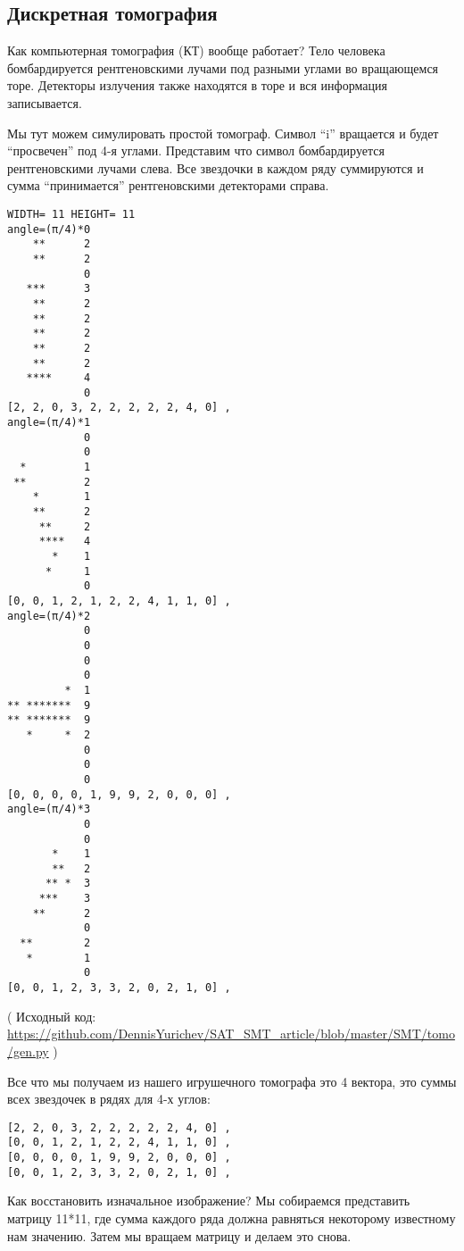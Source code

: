 \subsection{Дискретная томография}

Как компьютерная томография (КТ) вообще работает?
Тело человека бомбардируется рентгеновскими лучами под разными углами во вращающемся торе.
Детекторы излучения также находятся в торе и вся информация записывается.

Мы тут можем симулировать простой томограф.
Символ ``i'' вращается и будет ``просвечен'' под 4-я углами.
Представим что символ бомбардируется рентгеновскими лучами слева.
Все звездочки в каждом ряду суммируются и сумма ``принимается'' рентгеновскими детекторами справа.

\begin{lstlisting}
WIDTH= 11 HEIGHT= 11
angle=(π/4)*0
    **      2
    **      2
            0
   ***      3
    **      2
    **      2
    **      2
    **      2
    **      2
   ****     4
            0
[2, 2, 0, 3, 2, 2, 2, 2, 2, 4, 0] ,
angle=(π/4)*1
            0
            0
  *         1
 **         2
    *       1
    **      2
     **     2
     ****   4
       *    1
      *     1
            0
[0, 0, 1, 2, 1, 2, 2, 4, 1, 1, 0] ,
angle=(π/4)*2
            0
            0
            0
            0
         *  1
** *******  9
** *******  9
   *     *  2
            0
            0
            0
[0, 0, 0, 0, 1, 9, 9, 2, 0, 0, 0] ,
angle=(π/4)*3
            0
            0
       *    1
       **   2
      ** *  3
     ***    3
    **      2
            0
  **        2
   *        1
            0
[0, 0, 1, 2, 3, 3, 2, 0, 2, 1, 0] ,
\end{lstlisting}

( Исходный код: \url{https://github.com/DennisYurichev/SAT_SMT_article/blob/master/SMT/tomo/gen.py} )

Все что мы получаем из нашего игрушечного томографа это 4 вектора, это суммы всех звездочек в рядях для 4-х углов:

\begin{lstlisting}
[2, 2, 0, 3, 2, 2, 2, 2, 2, 4, 0] ,
[0, 0, 1, 2, 1, 2, 2, 4, 1, 1, 0] ,
[0, 0, 0, 0, 1, 9, 9, 2, 0, 0, 0] ,
[0, 0, 1, 2, 3, 3, 2, 0, 2, 1, 0] ,
\end{lstlisting}

Как восстановить изначальное изображение?
Мы собираемся представить матрицу 11*11, где сумма каждого ряда должна равняться некоторому известному нам значению.
Затем мы вращаем матрицу и делаем это снова.

